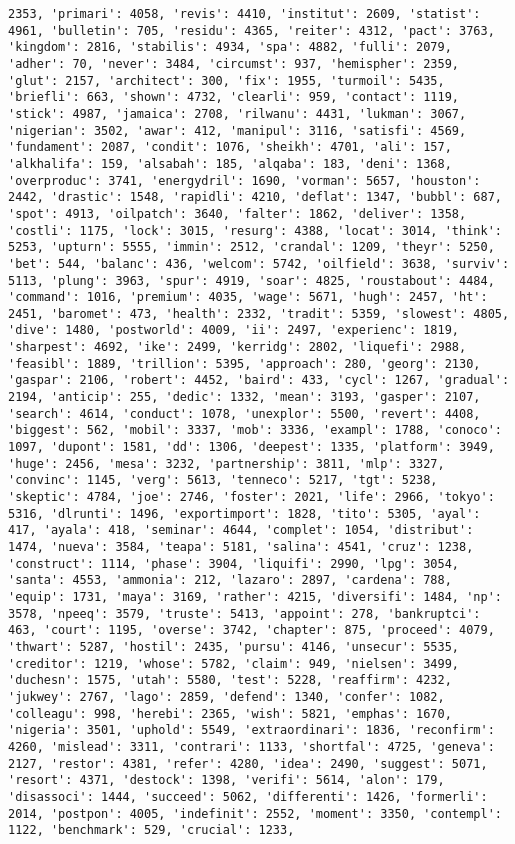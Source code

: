 \documentclass[11pt]{article}
\begin{document}
\begin{Verbatim}[commandchars=\\\{\}]
2353, 'primari': 4058, 'revis': 4410, 'institut': 2609, 'statist': 4961, 'bulletin': 705, 'residu': 4365, 'reiter': 4312, 'pact': 3763, 'kingdom': 2816, 'stabilis': 4934, 'spa': 4882, 'fulli': 2079, 'adher': 70, 'never': 3484, 'circumst': 937, 'hemispher': 2359, 'glut': 2157, 'architect': 300, 'fix': 1955, 'turmoil': 5435, 'briefli': 663, 'shown': 4732, 'clearli': 959, 'contact': 1119, 'stick': 4987, 'jamaica': 2708, 'rilwanu': 4431, 'lukman': 3067, 'nigerian': 3502, 'awar': 412, 'manipul': 3116, 'satisfi': 4569, 'fundament': 2087, 'condit': 1076, 'sheikh': 4701, 'ali': 157, 'alkhalifa': 159, 'alsabah': 185, 'alqaba': 183, 'deni': 1368, 'overproduc': 3741, 'energydril': 1690, 'vorman': 5657, 'houston': 2442, 'drastic': 1548, 'rapidli': 4210, 'deflat': 1347, 'bubbl': 687, 'spot': 4913, 'oilpatch': 3640, 'falter': 1862, 'deliver': 1358, 'costli': 1175, 'lock': 3015, 'resurg': 4388, 'locat': 3014, 'think': 5253, 'upturn': 5555, 'immin': 2512, 'crandal': 1209, 'theyr': 5250, 'bet': 544, 'balanc': 436, 'welcom': 5742, 'oilfield': 3638, 'surviv': 5113, 'plung': 3963, 'spur': 4919, 'soar': 4825, 'roustabout': 4484, 'command': 1016, 'premium': 4035, 'wage': 5671, 'hugh': 2457, 'ht': 2451, 'baromet': 473, 'health': 2332, 'tradit': 5359, 'slowest': 4805, 'dive': 1480, 'postworld': 4009, 'ii': 2497, 'experienc': 1819, 'sharpest': 4692, 'ike': 2499, 'kerridg': 2802, 'liquefi': 2988, 'feasibl': 1889, 'trillion': 5395, 'approach': 280, 'georg': 2130, 'gaspar': 2106, 'robert': 4452, 'baird': 433, 'cycl': 1267, 'gradual': 2194, 'anticip': 255, 'dedic': 1332, 'mean': 3193, 'gasper': 2107, 'search': 4614, 'conduct': 1078, 'unexplor': 5500, 'revert': 4408, 'biggest': 562, 'mobil': 3337, 'mob': 3336, 'exampl': 1788, 'conoco': 1097, 'dupont': 1581, 'dd': 1306, 'deepest': 1335, 'platform': 3949, 'huge': 2456, 'mesa': 3232, 'partnership': 3811, 'mlp': 3327, 'convinc': 1145, 'verg': 5613, 'tenneco': 5217, 'tgt': 5238, 'skeptic': 4784, 'joe': 2746, 'foster': 2021, 'life': 2966, 'tokyo': 5316, 'dlrunti': 1496, 'exportimport': 1828, 'tito': 5305, 'ayal': 417, 'ayala': 418, 'seminar': 4644, 'complet': 1054, 'distribut': 1474, 'nueva': 3584, 'teapa': 5181, 'salina': 4541, 'cruz': 1238, 'construct': 1114, 'phase': 3904, 'liquifi': 2990, 'lpg': 3054, 'santa': 4553, 'ammonia': 212, 'lazaro': 2897, 'cardena': 788, 'equip': 1731, 'maya': 3169, 'rather': 4215, 'diversifi': 1484, 'np': 3578, 'npeeq': 3579, 'truste': 5413, 'appoint': 278, 'bankruptci': 463, 'court': 1195, 'overse': 3742, 'chapter': 875, 'proceed': 4079, 'thwart': 5287, 'hostil': 2435, 'pursu': 4146, 'unsecur': 5535, 'creditor': 1219, 'whose': 5782, 'claim': 949, 'nielsen': 3499, 'duchesn': 1575, 'utah': 5580, 'test': 5228, 'reaffirm': 4232, 'jukwey': 2767, 'lago': 2859, 'defend': 1340, 'confer': 1082, 'colleagu': 998, 'herebi': 2365, 'wish': 5821, 'emphas': 1670, 'nigeria': 3501, 'uphold': 5549, 'extraordinari': 1836, 'reconfirm': 4260, 'mislead': 3311, 'contrari': 1133, 'shortfal': 4725, 'geneva': 2127, 'restor': 4381, 'refer': 4280, 'idea': 2490, 'suggest': 5071, 'resort': 4371, 'destock': 1398, 'verifi': 5614, 'alon': 179, 'disassoci': 1444, 'succeed': 5062, 'differenti': 1426, 'formerli': 2014, 'postpon': 4005, 'indefinit': 2552, 'moment': 3350, 'contempl': 1122, 'benchmark': 529, 'crucial': 1233, 
\end{Verbatim}
\end{document}
